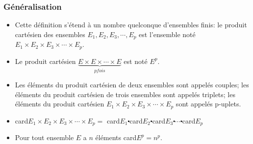 \subsubsection*{Généralisation}
\begin{itemize}
 \item[\textbullet]  Cette définition s'étend à un nombre quelconque d'ensembles finis:  le produit cartésien des ensembles $ E_{1}, E_{2}, E_{3}, \cdots ,E_{p} $ est  l'ensemble noté\\ $ E_{1}\times E_{2}\times E_{3}\times \cdots \times E_{p} $.
 \item[\textbullet] Le produit cartésien $\underbrace{  E\times E \times \cdots \times E}_{p fois} $   est noté $ E^{p} $.
 \item[\textbullet] Les éléments du  produit cartésien  de deux ensembles sont appelés couples; les éléments du  produit cartésien  de trois ensembles sont appelés triplets; les éléments du  produit cartésien $ E_{1}\times E_{2}\times E_{3}\times \cdots \times E_{p} $  sont appelés p-uplets.
 \item[\textbullet] card$ E_{1}\times E_{2}\times E_{3}\times \cdots \times E_{p}= $ card$ E_{1}\centerdot $card$ E_{2}\centerdot $card$ E_{3}\centerdot \cdots \centerdot $card$ E_{p} $
 \item[\textbullet] Pour tout ensemble $ E $ a $ n $ éléments  card$E^{p}=n^{p}$.
\end{itemize}

